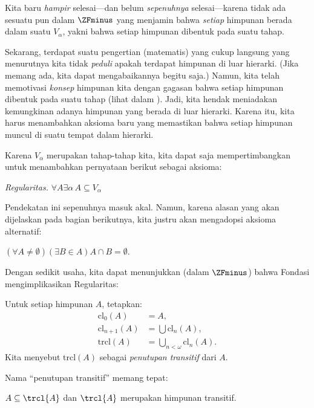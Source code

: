 \documentclass[../../../include/open-logic-section]{subfiles}
\begin{document}


Kita baru \emph{hampir} selesai---dan belum \emph{sepenuhnya}
selesai---karena tidak ada sesuatu pun dalam $\ZFminus$ yang menjamin bahwa
\emph{setiap} himpunan berada dalam suatu $V_\alpha$, yakni bahwa setiap
himpunan dibentuk pada suatu tahap.

Sekarang, terdapat suatu pengertian (matematis) yang cukup langsung yang
menurutnya kita tidak \emph{peduli} apakah terdapat himpunan di luar
hierarki. (Jika memang ada, kita dapat mengabaikannya begitu saja.) Namun,
kita telah memotivasi \emph{konsep} himpunan kita dengan gagasan bahwa setiap
himpunan dibentuk pada suatu tahap (lihat \stageshier{} dalam
). Jadi, kita hendak meniadakan kemungkinan adanya
himpunan yang berada di luar hierarki. Karena itu, kita harus menambahkan
aksioma baru yang memastikan bahwa setiap himpunan muncul di suatu tempat
dalam hierarki.

Karena $V_\alpha$ merupakan tahap-tahap kita, kita dapat saja
mempertimbangkan untuk menambahkan pernyataan berikut sebagai aksioma:

\begin{defish}
\emph{Regularitas.} $\forall A \exists \alpha\, A \subseteq V_\alpha$
\end{defish}

Pendekatan ini sepenuhnya masuk akal. Namun, karena alasan yang akan
dijelaskan pada bagian berikutnya, kita justru akan mengadopsi aksioma
alternatif:

\begin{axiom}[Fondasi]
$(\forall A \neq \emptyset)(\exists B \in A)A \cap B = \emptyset$.
\end{axiom}

Dengan sedikit usaha, kita dapat menunjukkan (dalam $\ZFminus$) bahwa Fondasi
mengimplikasikan Regularitas:
\begin{defn}
Untuk setiap himpunan $A$, tetapkan:
\begin{align*}
	\text{cl}_0(A) &= A,\\
	\text{cl}_{n+1}(A) &= \bigcup \text{cl}_n(A),\\
	\text{trcl}(A) &= \bigcup_{n < \omega} \text{cl}_{n}(A).
\end{align*}
Kita menyebut $\text{trcl}(A)$ sebagai \emph{penutupan transitif} dari $A$.
\end{defn}
\noindent
Nama ``penutupan transitif'' memang tepat:
\begin{prop}
$A \subseteq \trcl{A}$ dan $\trcl{A}$ merupakan himpunan transitif.
\end{prop}
\end{document}
